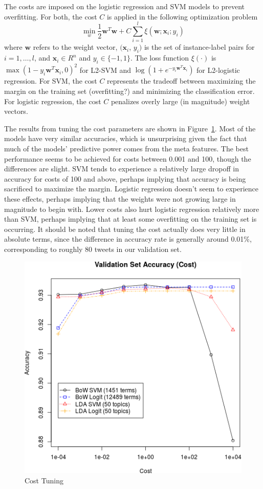 \documentclass{sig-alternate-05-2015}
\begin{document}
The costs are imposed on the logistic regression and SVM models to prevent overfitting. For both, the cost $C$ is applied in the following optimization problem
\begin{equation}
  \label{eq:svm}
  \min_w \frac{1}{2} \mathbf{w}^T\mathbf{w} + C \sum_{i=1}^l \xi(\mathbf{w}; \mathbf{x}_i; y_i)
\end{equation}
where $\mathbf{w}$ refers to the weight vector, $(\mathbf{x}_i$, $y_i)$ is the set of instance-label pairs for $i=1, \ldots, l$, and $\mathbf{x}_i \in R^n$ and $y_i \in \{-1,1\}$. The loss function $\xi(\cdot)$ is $\max(1-y_i\mathbf{w}^T\mathbf{x}_i,0)^2$ for L2-SVM and $\log(1+e^{-y_i\mathbf{w}^T\mathbf{x}_i})$ for L2-logistic regression. For SVM, the cost $C$ represents the tradeoff between maximizing the margin on the training set (overfitting?) and minimizing the classification error. For logistic regression, the cost $C$ penalizes overly large (in magnitude) weight vectors.

The results from tuning the cost parameters are shown in Figure~\ref{fig:cost}. Most of the models have very similar accuracies, which is unsurprising given the fact that much of the models' predictive power comes from the meta features. The best performance seems to be achieved for costs between 0.001 and 100, though the differences are slight. SVM tends to experience a relatively large dropoff in accuracy for costs of 100 and above, perhaps implying that accuracy is being sacrificed to maximize the margin. Logistic regression doesn't seem to experience these effects, perhaps implying that the weights were not growing large in magnitude to begin with. Lower costs also hurt logistic regression relatively more than SVM, perhaps implying that at least some overfitting on the training set is occurring. It should be noted that tuning the cost actually does very little in absolute terms, since the difference in accuracy rate is generally around 0.01\%, corresponding to roughly 80 tweets in our validation set.

\begin{figure}
  \centering
  \includegraphics[scale=0.5]{valid_cost.png}
  \caption{Cost Tuning}
  \label{fig:cost}
\end{figure}
\end{document}
